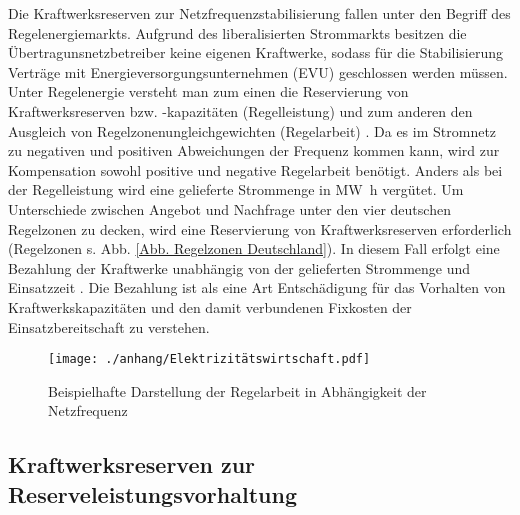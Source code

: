 		Die Kraftwerksreserven zur Netzfrequenzstabilisierung fallen unter den Begriff des Regelenergiemarkts.
		Aufgrund des liberalisierten Strommarkts besitzen die Übertragunsnetzbetreiber keine eigenen Kraftwerke, sodass für die Stabilisierung Verträge mit Energieversorgungsunternehmen (EVU) geschlossen werden müssen. \\
			
		Unter Regelenergie versteht man zum einen die Reservierung von Kraftwerksreserven bzw. -kapazitäten (Regelleistung) und zum anderen den Ausgleich von Regelzonenungleichgewichten (Regelarbeit) \cite{Elektrizitätswirtschaft}.
		Da es im Stromnetz zu negativen und positiven Abweichungen der Frequenz kommen kann, wird zur Kompensation sowohl positive und negative Regelarbeit benötigt.
		Anders als bei der Regelleistung wird eine gelieferte Strommenge in \si{\mega\watt\hour} vergütet.
		Um Unterschiede zwischen Angebot und Nachfrage unter den vier deutschen Regelzonen zu decken, wird eine Reservierung von Kraftwerksreserven erforderlich (Regelzonen s. Abb. \ref{Abb. Regelzonen Deutschland}). 
		In diesem Fall erfolgt eine Bezahlung der Kraftwerke unabhängig von der gelieferten Strommenge und Einsatzzeit \cite{Elektrizitätswirtschaft}. 
		Die Bezahlung ist als eine Art Entschädigung für das Vorhalten von Kraftwerkskapazitäten und den damit verbundenen Fixkosten der Einsatzbereitschaft zu verstehen.   \\
		
		\begin{figure} [H]
			\centering
			\label{Abb. Beispielhafte Darstellung der Regelenergie in Abhängigkeit der Netzfrequenz}
			\texttt{[image: ./anhang/Elektrizitätswirtschaft.pdf]}
			\caption{Beispielhafte Darstellung der Regelarbeit in Abhängigkeit der Netzfrequenz \cite{Elektrizitätswirtschaft}}
		\end{figure}
		
		
	
	\subsection{Kraftwerksreserven zur Reserveleistungsvorhaltung}